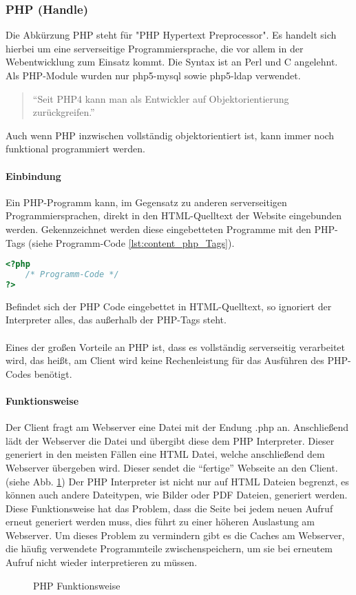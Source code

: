 \subsubsection{PHP (Handle)}
Die Abkürzung PHP steht für "PHP Hypertext Preprocessor". Es handelt sich hierbei um eine serverseitige Programmiersprache, die vor allem in der Webentwicklung zum Einsatz kommt. Die Syntax ist an Perl und C angelehnt.\\
Als PHP-Module wurden nur php5-mysql sowie php5-ldap verwendet.\\
\begin{quote}
\enquote{Seit PHP4 kann man als Entwickler auf Objektorientierung zurückgreifen.} \cite[S. 231]{php5}
\end{quote}
Auch wenn PHP inzwischen vollständig objektorientiert ist, kann immer noch funktional programmiert werden.
\paragraph{Einbindung\\}
Ein PHP-Programm kann, im Gegensatz zu anderen serverseitigen Programmiersprachen, direkt in den HTML-Quelltext der Website eingebunden werden. Gekennzeichnet werden diese eingebetteten Programme mit den PHP-Tags (siehe Programm-Code \ref{lst:content_php_Tags}).\\
\begin{lstlisting}[style=custom, language=PHP,  caption={PHP-Tags},label={lst:content_php_Tags}]
<?php 
	/* Programm-Code */
?>
\end{lstlisting}
Befindet sich der PHP Code eingebettet in HTML-Quelltext, so ignoriert der Interpreter alles, das außerhalb der PHP-Tags steht.\\\\
Eines der großen Vorteile an PHP ist, dass es vollständig serverseitig verarbeitet wird, das heißt, am Client wird keine Rechenleistung für das Ausführen des PHP-Codes benötigt.
\paragraph{Funktionsweise\\}
Der Client fragt am Webserver eine Datei mit der Endung .php an. Anschließend lädt der Webserver die Datei und übergibt diese dem PHP Interpreter. Dieser generiert in den meisten Fällen eine HTML Datei, welche anschließend dem Webserver übergeben wird. Dieser sendet die \enquote{fertige} Webseite an den Client. (siehe Abb. \ref{fig:content_php_PHP_Funktion}) Der PHP Interpreter ist nicht nur auf HTML Dateien begrenzt, es können auch andere Dateitypen, wie Bilder oder PDF Dateien, generiert werden. Diese Funktionsweise hat das Problem, dass die Seite bei jedem neuen Aufruf erneut generiert werden muss, dies führt zu einer höheren Auslastung am Webserver. Um dieses Problem zu vermindern gibt es die Caches am Webserver, die häufig verwendete Programmteile zwischenspeichern, um sie bei erneutem Aufruf nicht wieder interpretieren zu müssen.
\begin{figure}[H]
\centering
{}
\caption{PHP Funktionsweise}
\label{fig:content_php_PHP_Funktion}
\end{figure}

